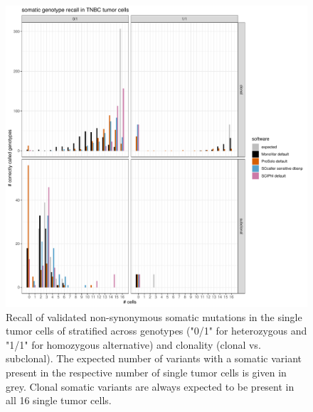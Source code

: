 \documentclass[authoryear,preprint,11pt]{scrartcl}
\begin{document}
\begin{figure}[!tpb]
  \includegraphics[width=\linewidth]{figs/Wang2014/Wang2014_validated_somatic_genotype_recall.pdf}
 \caption{
 Recall of validated non-synonymous somatic mutations in the single tumor cells of \cite{wang_clonal_2014} stratified across genotypes ("0/1" for heterozygous and "1/1" for homozygous alternative) and clonality (clonal vs. subclonal).
 The expected number of variants with a somatic variant present in the respective number of single tumor cells is given in grey.
 Clonal somatic variants are always expected to be present in all 16 single tumor cells.
 }
 \label{fig:somatic-recall}
\end{figure}
\end{document}

